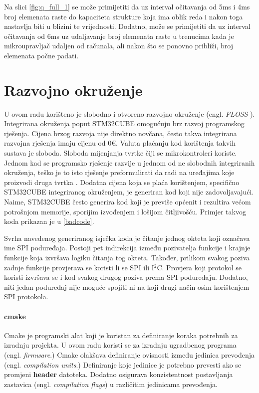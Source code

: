\documentclass[times, utf8, diplomski]{diplomski}
\begin{document}
Na slici \ref{fig:q_full_1} se može primijetiti da uz interval očitavanja od 5ms i 4ms broj elemenata raste do kapaciteta strukture koja ima oblik reda i nakon toga nastavlja biti u blizini te vrijednosti.
Dodatno, može se primijetiti da uz interval očitavanja od 6ms uz udaljavanje broj elemenata raste u trenucima kada je mikroupravljač udaljen od računala, ali nakon što se ponovno približi, broj elemenata počne padati.

\chapter{Razvojno okruženje}
U ovom radu korišteno je slobodno i otvoreno razvojno okruženje (engl. \textit{FLOSS} \cite{FLOSS}). Integrirana okruženja poput STM32CUBE omogućuju brz razvoj programskog rješenja. Cijena brzog razvoja nije direktno novčana, često takva integrirana razvojna rješenja imaju cijenu od 0€. Valuta plaćanju kod korištenja takvih sustava je sloboda. Sloboda mijenjanja tvrtke čiji se mikrokontroleri koriste. Jednom kad se programsko rješenje razvije u jednom od ne slobodnih integriranih okruženja, teško je to isto rješenje preformulirati da radi na uređajima koje proizvodi druga tvrtka \cite{VENDORLOCKIN}. Dodatna cijena koja se plaća korištenjem, specifično STM32CUBE integriranog okruženjem, je generiran kod koji nije zadovoljavajući. Naime, STM32CUBE često generira kod koji je previše općenit i rezultira većom potrošnjom memorije, sporijim izvođenjem i lošijom čitljivošću. Primjer takvog koda prikazan je u \ref{badcode}.



Svrha navedenog generiranog isječka koda je čitanje jednog okteta koji označava ime SPI poduređaja. Postoji pet indirekcija između pozivatelja funkcije i krajnje funkcije koja izvršava logiku čitanja tog okteta. Također, prilikom svakog poziva zadnje funkcije provjerava se koristi li se SPI ili I\(^2\)C. Provjera koji protokol se koristi izvršava se i kod svakog drugog poziva prema SPI poduređaju. Dodatno, niti jedan poduređaj nije moguće spojiti ni na koji drugi način osim korištenjem SPI protokola.

\subsubsection{cmake}
Cmake je programski alat koji je koristan za definiranje koraka potrebnih za izradnju projekta. U ovom radu koristi se za izradnju ugradbenog programa (engl. \textit{firmware}.) Cmake olakšava definiranje ovisnosti između jedinica prevođenja (engl. \textit{compilation units}.) Definiranje koje jedinice je potrebno prevesti ako se promjeni \textbf{header} datoteka. Dodatno osigurava konzistentnost postavljanja zastavica (engl. \textit{compilation flags}) u različitim jedinicama prevođenja.
\end{document}
